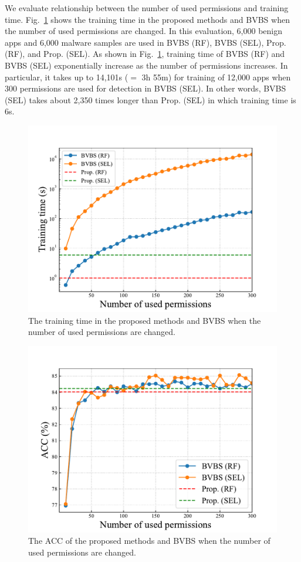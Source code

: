 \documentclass{ieeeaccess}
\newcommand{\myfigurename}{Fig.}
\begin{document}
We evaluate relationship between the number of used permissions and training time.
\myfigurename~\ref{fig:perm_time} shows the training time in the proposed methods and BVBS when the number of used permissions are changed.
In this evaluation, 6,000 benign apps and 6,000 malware samples are used in BVBS (RF), BVBS (SEL), Prop. (RF), and Prop. (SEL).
As shown in \myfigurename~\ref{fig:perm_time}, training time of BVBS (RF) and BVBS (SEL) exponentially increase as the number of permissions increases.
In particular, it takes up to 14,101s ($=$ 3h 55m) for training of 12,000 apps when 300 permissions are used for detection in BVBS (SEL).
In other words, BVBS (SEL) takes about 2,350 times longer than Prop. (SEL) in which training time is 6s.
\begin{figure}[t]
  \centering
  \includegraphics[scale=0.44]{./figures/kato9.pdf}
  \caption{The training time in the proposed methods and BVBS when the number of used permissions are changed.}
  \label{fig:perm_time}
\end{figure}
\begin{figure}[t]
  \centering
  \includegraphics[scale=0.45]{./figures/kato10.pdf}
  \caption{The ACC of the proposed methods and BVBS when the number of used permissions are changed.}
  \label{fig:perm_acc}
\end{figure}
\end{document}
